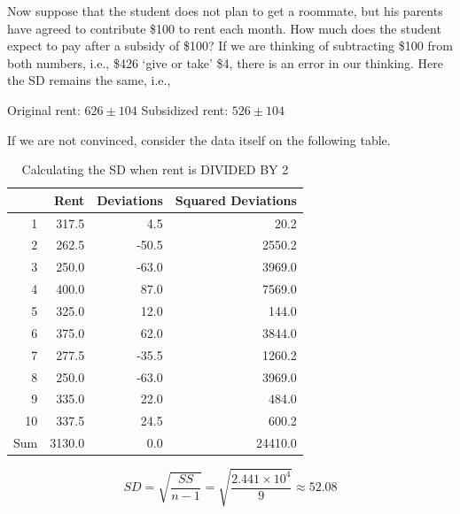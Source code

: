 \documentclass[11pt, chapterprefix=true]{scrbook}\usepackage[]{graphicx}\usepackage[]{color}
\begin{document}
Now suppose that the student does not plan to get a roommate, but his parents have agreed to contribute \$100 to rent each month.  How much does the student expect to pay after a subsidy of \$100?  If we are thinking of subtracting \$100 from both numbers, i.e., \$426 `give or take' \$4, there is an error in our thinking.  Here the SD remains the same, i.e.,

\begin{center}
Original rent: $ 626 \pm 104 $ \hspace{2cm} Subsidized rent: $ 526 \pm 104 $
\end{center}

If we are not convinced, consider the data itself on the following table.



\begin{table}[ht]
\centering
\begin{tabular}{rrrr}
  \hline
 & Rent & Deviations & Squared Deviations \\ 
  \hline
1 & 317.5 & 4.5 & 20.2 \\ 
  2 & 262.5 & -50.5 & 2550.2 \\ 
  3 & 250.0 & -63.0 & 3969.0 \\ 
  4 & 400.0 & 87.0 & 7569.0 \\ 
  5 & 325.0 & 12.0 & 144.0 \\ 
  6 & 375.0 & 62.0 & 3844.0 \\ 
  7 & 277.5 & -35.5 & 1260.2 \\ 
  8 & 250.0 & -63.0 & 3969.0 \\ 
  9 & 335.0 & 22.0 & 484.0 \\ 
  10 & 337.5 & 24.5 & 600.2 \\ 
  Sum & 3130.0 & 0.0 & 24410.0 \\ 
   \hline
\end{tabular}
\caption{Calculating the SD when rent is DIVIDED BY 2} 
\end{table}


$$ SD = \sqrt{ \frac{ SS}{n - 1}} = \sqrt{ \frac{ \ensuremath{2.441\times 10^{4}}}{9}} \approx 52.08 $$

\newpage

\end{document}
